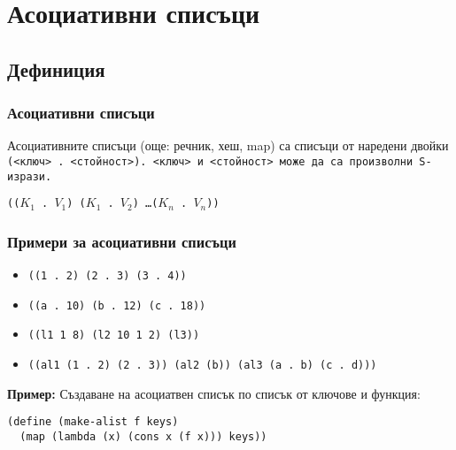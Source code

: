 \documentclass[alsotrans]{beamerswitch}
\begin{document}
\section{Асоциативни списъци}

\subsection{Дефиниция}

\begin{frame}[label=current]
  \frametitle{Асоциативни списъци}

  \begin{definition}
    Асоциативните списъци (още: речник, хеш, map) са списъци от наредени двойки \tt(<ключ> \tt. <стойност>\tt). <ключ> и <стойност> може да са произволни S-изрази.
  \end{definition}
  \vspace{2ex}
  \tt{((}$K_1$ \tt. $V_1$\tt) \tt($K_1$ \tt. $V_2$\tt) \ldots \tt($K_n$ \tt. $V_n$\tt{))}\\[2ex]
\end{frame}

\begin{frame}[fragile]
  \frametitle{Примери за асоциативни списъци}

  \begin{itemize}[<+->]
  \item \tt{((1 . 2) (2 . 3) (3 . 4))}
  \item \tt{((a . 10) (b . 12) (c . 18))}
  \item \tt{((l1 1 8) (l2 10 1 2) (l3))}
  \item \tt{((al1 (1 . 2) (2 . 3)) (al2 (b)) (al3 (a . b) (c . d)))}
  \end{itemize}
  \vspace{2ex}
  \onslide<+->
  \textbf{Пример:}
  Създаване на асоциатвен списък по списък от ключове и функция:
\begin{lstlisting}
(define (make-alist f keys)
  (map (lambda (x) (cons x (f x))) keys))
\end{lstlisting}
  \onslide<+->
\end{frame}
\end{document}
